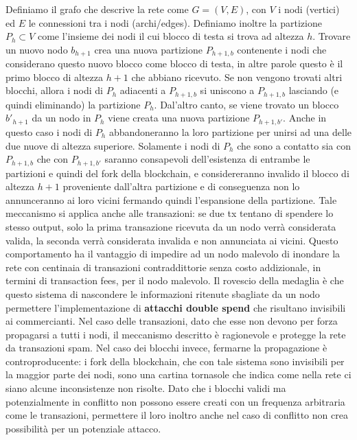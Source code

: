 Definiamo il grafo che descrive la rete come $G = (V,E)$, con $V$ i nodi (vertici) ed $E$ le connessioni tra i nodi (archi/edges). Definiamo inoltre la partizione $P_h \subset V$ come l'insieme dei nodi il cui blocco di testa si trova ad altezza $h$. Trovare un nuovo nodo $b_{h+1}$ crea una nuova partizione $P_{h+1,b}$ contenente i nodi che considerano questo nuovo blocco come blocco di testa, in altre parole questo è il primo blocco di altezza $h+1$ che abbiano ricevuto. Se non vengono trovati altri blocchi, allora i nodi di $P_h$ adiacenti a $P_{h+1,b}$ si uniscono a $P_{h+1,b}$ lasciando (e quindi eliminando) la partizione $P_h$. Dal'altro canto, se viene trovato un blocco $b'_{h+1}$ da un nodo in $P_h$ viene creata una nuova partizione $P_{h+1,b'}$. Anche in questo caso i nodi di $P_h$ abbandoneranno la loro partizione per unirsi ad una delle due nuove di altezza superiore. Solamente i nodi di $P_h$ che sono a contatto sia con $P_{h+1,b}$ che con $P_{h+1,b'}$ saranno consapevoli dell'esistenza di entrambe le partizioni e quindi del fork della blockchain, e considereranno invalido il blocco di altezza $h+1$ proveniente dall'altra partizione e di conseguenza non lo annunceranno ai loro vicini fermando quindi l'espansione della partizione. Tale meccanismo si applica anche alle transazioni: se due tx tentano di spendere lo stesso output, solo la prima transazione ricevuta da un nodo verrà considerata valida, la seconda verrà considerata invalida e non annunciata ai vicini. Questo comportamento ha il vantaggio di impedire ad un nodo malevolo di inondare la rete con centinaia di transazioni contraddittorie senza costo addizionale, in termini di transaction fees, per il nodo malevolo. Il rovescio della medaglia è che questo sistema di nascondere le informazioni ritenute sbagliate da un nodo permettere l'implementazione di \textbf{attacchi double spend} che risultano invisibili ai commercianti. Nel caso delle transazioni, dato che esse non devono per forza propagarsi a tutti i nodi, il meccanismo descritto è ragionevole e protegge la rete da transazioni spam. Nel caso dei blocchi invece, fermarne la propagazione è controproducente: i fork della blockchain, che con tale sistema sono invisibili per la maggior parte dei nodi, sono una cartina tornasole che indica come nella rete ci siano alcune inconsistenze non risolte. Dato che i blocchi validi ma potenzialmente in conflitto non possono essere creati con un frequenza arbitraria come le transazioni, permettere il loro inoltro anche nel caso di conflitto non crea possibilità per un potenziale attacco.

